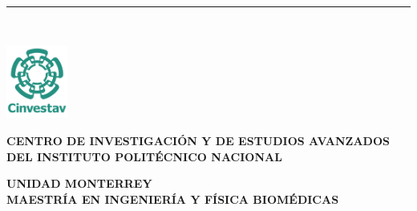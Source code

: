 %
\begin{titlepage}
	\flushright
	\hfill
	\vfill
	{\LARGE\thesisTitle \par}
	\rule[5pt]{\textwidth}{.4pt} \par
	{\Large\thesisName}
	\vfill
	\textit{\large\thesisDate} \\
\end{titlepage}


\begin{titlepage}
	\tgherosfont
	\centering
	
	\noindent
	\begin{minipage}[h]{0.05\textwidth}
		\hspace{-2cm} %
		\includegraphics[width=2cm]{gfx/logospng1.png}
	\end{minipage}%
	\begin{minipage}[h]{0.95\textwidth}
		\centering
		\large 
		\textbf{CENTRO DE INVESTIGACIÓN Y DE ESTUDIOS AVANZADOS DEL INSTITUTO POLITÉCNICO NACIONAL}
	\end{minipage}


	{\large \textbf{UNIDAD MONTERREY}} \\[4mm]
	{\large \textbf{MAESTRÍA EN INGENIERÍA Y FÍSICA BIOMÉDICAS}} \\[10mm]
	



\end{titlepage}
